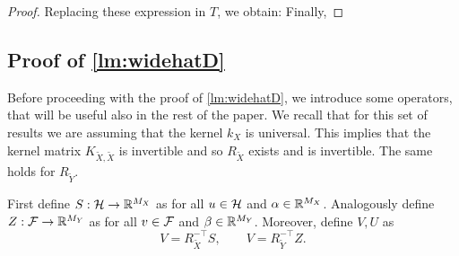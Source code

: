 \begin{proof}
Replacing these expression in $T$, we obtain:
Finally,
\end{proof}



\subsection{Proof of \cref{lm:widehatD}}


Before proceeding with the proof of \cref{lm:widehatD}, we introduce some operators, that will be useful also in the rest of the paper. We recall that for this set of results we are assuming that the kernel $k_X$ is universal. This implies that the kernel matrix $K_{\tilde{X},\tilde{X}}$ is invertible and so $R_{\tilde{X}}$ exists and is invertible. The same holds for $R_{\tilde Y}$.

\begin{definition}\label{def:operators}
First define $S:\mathcal H \to \mathbb R^{M_X}$ as
for all $u \in \mathcal H$ and $\alpha \in \mathbb R^{M_X}$.
Analogously define $Z:{\cal F} \to \mathbb R^{M_Y}$ as
for all $v \in {\cal F}$ and $\beta \in \mathbb R^{M_Y}$.
Moreover, define $V, U$ as
$$V = R^{-\top}_{\tilde X} S, \qquad V = R^{-\top}_{\tilde Y} Z.$$
\end{definition}

